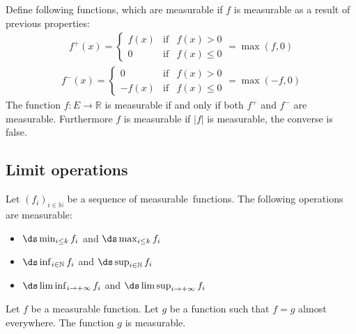         \begin{theorem}
		Define following functions, which are measurable if $f$ is measurable as a result of previous properties:
		\begin{gather}
			\label{lebesgue:positive_part}
                	f^+(x) = \left\{
                	\begin{array}{ccc}
				f(x)&\text{if}&f(x)>0\\
		                0&\text{if}&f(x)\leq0
			\end{array}\right. = \max(f,0)
		\end{gather}
	        \begin{gather}
			\label{lebesgue:negative_part}
	                f^-(x) = \left\{
	                \begin{array}{ccc}
				0&\text{if}&f(x)>0\\
		                -f(x)&\text{if}&f(x)\leq0
			\end{array}\right. = \max(-f,0)
		\end{gather}
	        The function $f:E\rightarrow\mathbb{R}$ is measurable if and only if both $f^+$ and $f^-$ are measurable. Furthermore $f$ is measurable if $|f|$ is measurable, the converse is false.
	\end{theorem}

\subsection{Limit operations}
 
    	\begin{property}
		Let $(f_i)_{i\in\mathbb{N}}$ be a sequence of measurable\footnotemark\ functions. The following operations are measurable:
	        \begin{itemize}
			\item $\ds\min_{i\leq k}f_i$ and $\ds\max_{i\leq k}f_i$
	                \item $\ds\inf_{i\in\mathbb{N}}f_i$ and $\ds\sup_{i\in\mathbb{N}}f_i$
	                \item $\ds\liminf_{i\rightarrow+\infty}f_i$ and $\ds\limsup_{i\rightarrow+\infty}f_i$
		\end{itemize}
	\end{property}
        
        \begin{property}
		Let $f$ be a measurable function. Let $g$ be a function such that $f=g$ almost everywhere. The function $g$ is measurable.
	\end{property}
	
